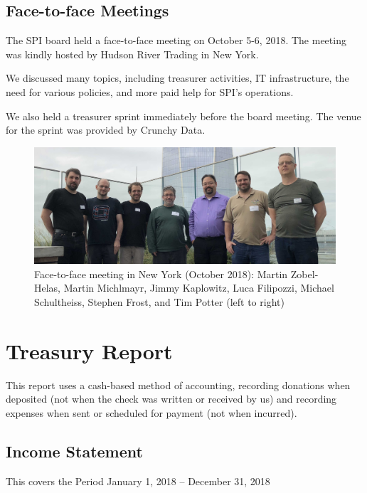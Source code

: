 \documentclass[a4paper]{report}
\begin{document}
\section{Face-to-face Meetings}

The SPI board held a face-to-face meeting on October 5-6, 2018.
The meeting was kindly hosted by Hudson River Trading in New York.

We discussed many topics, including treasurer activities, IT
infrastructure, the need for various policies, and more paid help for
SPI's operations.

We also held a treasurer sprint immediately before the board meeting.
The venue for the sprint was provided by Crunchy Data.

\begin{figure}[h]
\centering

\includegraphics[scale=0.14]{images/2018-october-f2f}

\caption{Face-to-face meeting in New York (October 2018): Martin
Zobel-Helas, Martin Michlmayr, Jimmy Kaplowitz, Luca Filipozzi, Michael
Schultheiss, Stephen Frost, and Tim Potter (left to right)}

\end{figure}

\chapter{Treasury Report}

This report uses a cash-based method of accounting, recording donations
when deposited (not when the check was written or received by us) and
recording expenses when sent or scheduled for payment (not when
incurred).

\section{Income Statement}

This covers the Period January 1, 2018 -- December 31, 2018
\end{document}

